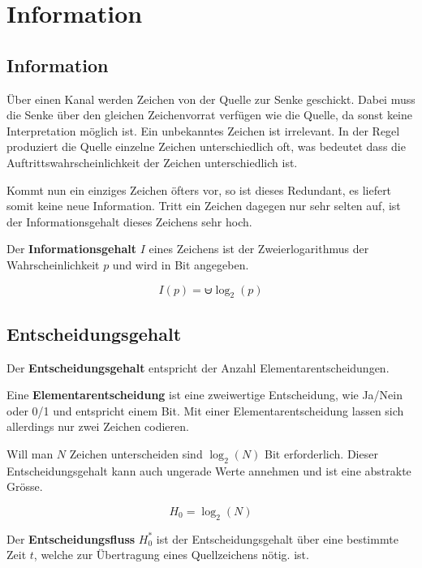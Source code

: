 \section{Information}

\subsection{Information}
 
Über einen Kanal werden Zeichen von der Quelle zur Senke geschickt. Dabei muss
die Senke über den gleichen Zeichenvorrat verfügen wie die Quelle, da sonst
keine Interpretation möglich ist. Ein unbekanntes Zeichen ist irrelevant. In der
Regel produziert die Quelle einzelne Zeichen unterschiedlich oft, was bedeutet
dass die Auftrittswahrscheinlichkeit der Zeichen unterschiedlich ist. 

Kommt nun ein einziges Zeichen öfters vor, so ist dieses Redundant, es liefert
somit keine neue Information. Tritt ein Zeichen dagegen nur sehr selten auf, ist
der Informationsgehalt dieses Zeichens sehr hoch. 

Der \textbf{Informationsgehalt} $I$ eines Zeichens ist der Zweierlogarithmus der
Wahrscheinlichkeit $p$ und wird in Bit angegeben.

\begin{displaymath}
	I(p) = \uminus \log_2(p)
\end{displaymath}


\subsection{Entscheidungsgehalt}

Der \textbf{Entscheidungsgehalt} entspricht der Anzahl Elementarentscheidungen.

Eine \textbf{Elementarentscheidung} ist eine zweiwertige Entscheidung, wie
Ja/Nein oder 0/1 und entspricht einem Bit. Mit einer Elementarentscheidung
lassen sich allerdings nur zwei Zeichen codieren. 

Will man $N$ Zeichen unterscheiden sind $\log_2(N)$ Bit erforderlich. Dieser
Entscheidungsgehalt kann auch ungerade Werte annehmen und ist eine abstrakte
Grösse.

\begin{displaymath}
	H_0=\log_2(N)
\end{displaymath}

Der \textbf{Entscheidungsfluss} $H^*_0$ ist der Entscheidungsgehalt über eine
bestimmte Zeit $t$, welche zur Übertragung eines Quellzeichens nötig. ist.

